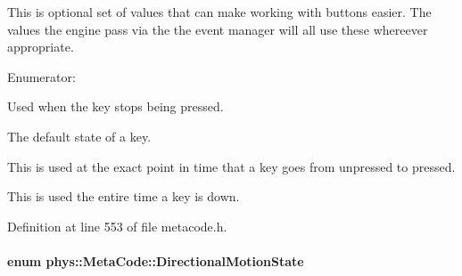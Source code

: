 This is optional set of values that can make working with buttons easier. The values the engine pass via the the event manager will all use these whereever appropriate. \begin{Desc}
\item[Enumerator: ]\par
\begin{description}
\item[{\em 
\hypertarget{classphys_1_1MetaCode_a2fdfb26b3e50ceb0ccc60bfc4c3d6ac2a6b5564408703517f36debd8c423e2dee}{
BUTTON\_\-LIFTING}
\label{da/dc9/classphys_1_1MetaCode_a2fdfb26b3e50ceb0ccc60bfc4c3d6ac2a6b5564408703517f36debd8c423e2dee}
}]Used when the key stops being pressed. \item[{\em 
\hypertarget{classphys_1_1MetaCode_a2fdfb26b3e50ceb0ccc60bfc4c3d6ac2ae275c52779b0f6ec37533af256a70cc3}{
BUTTON\_\-UP}
\label{da/dc9/classphys_1_1MetaCode_a2fdfb26b3e50ceb0ccc60bfc4c3d6ac2ae275c52779b0f6ec37533af256a70cc3}
}]The default state of a key. \item[{\em 
\hypertarget{classphys_1_1MetaCode_a2fdfb26b3e50ceb0ccc60bfc4c3d6ac2a33669b2b9ca814664296da55702e412d}{
BUTTON\_\-PRESSING}
\label{da/dc9/classphys_1_1MetaCode_a2fdfb26b3e50ceb0ccc60bfc4c3d6ac2a33669b2b9ca814664296da55702e412d}
}]This is used at the exact point in time that a key goes from unpressed to pressed. \item[{\em 
\hypertarget{classphys_1_1MetaCode_a2fdfb26b3e50ceb0ccc60bfc4c3d6ac2a5b52ee1db94dbc2db23f3b4c267b5438}{
BUTTON\_\-DOWN}
\label{da/dc9/classphys_1_1MetaCode_a2fdfb26b3e50ceb0ccc60bfc4c3d6ac2a5b52ee1db94dbc2db23f3b4c267b5438}
}]This is used the entire time a key is down. \end{description}
\end{Desc}



Definition at line 553 of file metacode.h.

\hypertarget{classphys_1_1MetaCode_ad6ed6266b5f4219a6f5da29ebe018757}{
\paragraph[{DirectionalMotionState}]{\setlength{\rightskip}{0pt plus 5cm}enum {\bf phys::MetaCode::DirectionalMotionState}}\hfill}
\label{da/dc9/classphys_1_1MetaCode_ad6ed6266b5f4219a6f5da29ebe018757}


